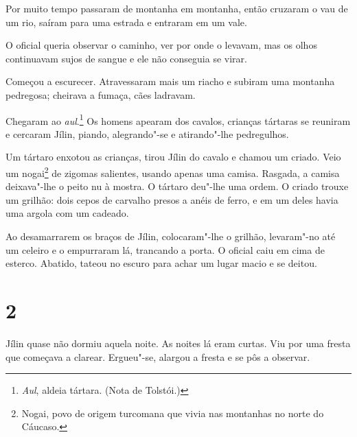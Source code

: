 Por muito tempo passaram de montanha em montanha, então cruzaram o vau
de um rio, saíram para uma estrada e entraram em um vale.

O oficial queria observar o caminho, ver por onde o levavam, mas os olhos
continuavam sujos de sangue e ele não conseguia se virar.

Começou a escurecer. Atravessaram mais um riacho e subiram uma
montanha pedregosa; cheirava a fumaça, cães ladravam.

Chegaram ao \emph{aul}.\footnote{\emph{Aul}, aldeia tártara.
  (Nota de Tolstói.)} Os homens apearam dos cavalos, crianças tártaras
se reuniram e cercaram Jílin, piando, alegrando"-se e atirando"-lhe
pedregulhos.

Um tártaro enxotou as crianças, tirou Jílin do cavalo e chamou um
criado. Veio um nogai\footnote{Nogai, povo de origem turcomana que
  vivia nas montanhas no norte do Cáucaso.} de zigomas salientes, usando
apenas uma camisa. Rasgada, a camisa deixava"-lhe o peito nu à mostra. O
tártaro deu"-lhe uma ordem. O criado trouxe um grilhão: dois cepos de
carvalho presos a anéis de ferro, e em um deles havia uma argola com um
cadeado.

Ao desamarrarem os braços de Jílin, colocaram"-lhe o grilhão, levaram"-no
até um celeiro e o empurraram lá, trancando a porta. O oficial caiu em
cima de esterco. Abatido, tateou no escuro para achar um lugar macio e
se deitou.

\section{2}

Jílin quase não dormiu aquela noite. As noites lá eram curtas. Viu por
uma fresta que começava a clarear. Ergueu"-se, alargou a fresta e se pôs
a observar.


